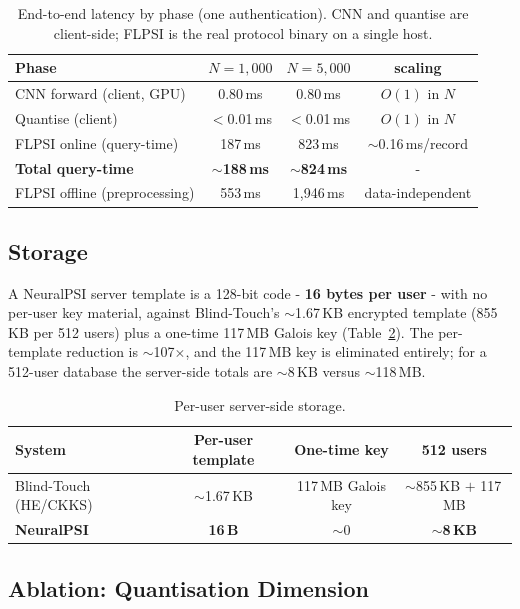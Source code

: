 \documentclass[11pt,a4paper]{article}
\begin{document}
\begin{table}[h]
\centering
\caption{End-to-end latency by phase (one authentication). CNN and quantise are
client-side; FLPSI is the real protocol binary on a single host.}
\label{tab:latency}
\begin{tabular}{lccc}
\hline
Phase & $N=1{,}000$ & $N=5{,}000$ & scaling \\
\hline
CNN forward (client, GPU)      & 0.80\,ms  & 0.80\,ms  & $O(1)$ in $N$ \\
Quantise (client)              & $<$0.01\,ms & $<$0.01\,ms & $O(1)$ in $N$ \\
FLPSI online (query-time)      & 187\,ms   & 823\,ms   & $\sim$0.16\,ms/record \\
\textbf{Total query-time}      & \textbf{$\sim$188\,ms} & \textbf{$\sim$824\,ms} & - \\
\hline
FLPSI offline (preprocessing)  & 553\,ms   & 1{,}946\,ms & data-independent \\
\hline
\end{tabular}
\end{table}

\subsection{Storage}

A NeuralPSI server template is a 128-bit code - \textbf{16 bytes per user} - with no
per-user key material, against Blind-Touch's $\sim$1.67\,KB encrypted template
(855\,KB per 512 users) plus a one-time 117\,MB Galois key (Table~\ref{tab:storage}). The
per-template reduction is $\sim$107$\times$, and the 117\,MB key is eliminated entirely; for
a 512-user database the server-side totals are $\sim$8\,KB versus $\sim$118\,MB.

\begin{table}[h]
\centering
\caption{Per-user server-side storage.}
\label{tab:storage}
\begin{tabular}{lccc}
\hline
System & Per-user template & One-time key & 512 users \\
\hline
Blind-Touch (HE/CKKS) & $\sim$1.67\,KB & 117\,MB Galois key & $\sim$855\,KB $+$ 117\,MB \\
\textbf{NeuralPSI}    & \textbf{16\,B} & $\sim$0 & \textbf{$\sim$8\,KB} \\
\hline
\end{tabular}
\end{table}

\subsection{Ablation: Quantisation Dimension}
\end{document}
